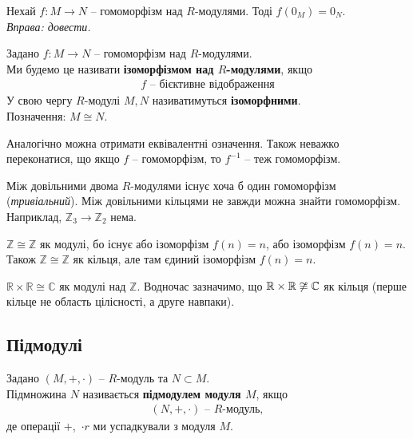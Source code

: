 \documentclass{math_library}
\begin{document}
\begin{proposition}
Нехай $f \colon M \to N$ -- гомоморфізм над $R$-модулями. Тоді $f(0_M) = 0_N$.\\
\textit{Вправа: довести.}
\end{proposition}

\begin{definition}
Задано $f \colon M \to N$ -- гомоморфізм над $R$-модулями.\\
Ми будемо це називати \textbf{ізоморфізмом над $R$-модулями}, якщо
\begin{align*}
f \text{ -- бієктивне відображення}
\end{align*}
У свою чергу $R$-модулі $M,N$ називатимуться \textbf{ізоморфними}.\\
Позначення: $M \cong N$.
\end{definition}

\begin{remark}
Аналогічно можна отримати еквівалентні означення. Також неважко переконатися, що якщо $f$ -- гомоморфізм, то $f^{-1}$ -- теж гомоморфізм.
\end{remark}

\begin{remark}
Між довільними двома $R$-модулями існує хоча б один гомоморфізм (\textit{тривіальний}). Між довільними кільцями не завжди можна знайти гомоморфізм. Наприклад, $\mathbb{Z}_3 \to \mathbb{Z}_2$ нема.
\end{remark}

\begin{example}
$\mathbb{Z} \cong \mathbb{Z}$ як модулі, бо існує або ізоморфізм $f(n) = n$, або ізоморфізм $f(n) = n$. Також $\mathbb{Z} \cong \mathbb{Z}$ як кільця, але там єдиний ізоморфізм $f(n) = n$.
\end{example}

\begin{example}
$\mathbb{R} \times \mathbb{R} \cong \mathbb{C}$ як модулі над $\mathbb{Z}$. Водночас зазначимо, що $\mathbb{R} \times \mathbb{R} \centernot\cong \mathbb{C}$ як кільця (перше кільце не область цілісності, а друге навпаки).
\end{example}

\subsection{Підмодулі}
\begin{definition}
Задано $(M,+,\cdot)$ -- $R$-модуль та $N \subset M$.\\
Підмножина $N$ називається \textbf{підмодулем модуля $M$}, якщо 
\begin{align*}
(N,+,\cdot) \text{ -- $R$-модуль},
\end{align*}
де операції $+$,\ $\cdot r$ ми успадкували з модуля $M$.
\end{definition}
\end{document}
